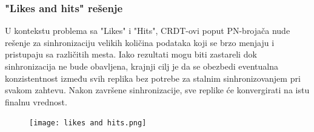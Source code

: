 \documentclass[12pt]{article}
\begin{document}
    \subsubsection{"Likes and hits" rešenje}

    U kontekstu problema sa "Likes" i "Hits", CRDT-ovi poput PN-brojača nude rešenje za sinhronizaciju velikih količina podataka koji se brzo menjaju i pristupaju sa različitih mesta. Iako rezultati mogu biti zastareli dok sinhronizacija ne bude obavljena, krajnji cilj je da se obezbedi eventualna konzistentnost između svih replika bez potrebe za stalnim sinhronizovanjem pri svakom zahtevu. Nakon završene sinhronizacije, sve replike će konvergirati na istu finalnu vrednost.

    \begin{figure}[h]
        \centering
        \texttt{[image: likes and hits.png]}
        \label{fig:nls_demo}
    \end{figure}
    
\end{document}
